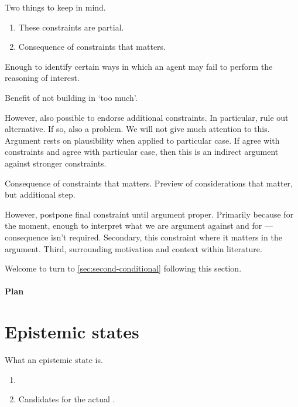 \begin{note}
  Two things to keep in mind.

  \begin{enumerate}
  \item These constraints are partial.
  \item Consequence of constraints that matters.
  \end{enumerate}

  Enough to identify certain ways in which an agent may fail to perform the reasoning of interest.

  Benefit of not building in `too much'.

  However, also possible to endorse additional constraints.
  In particular, rule out alternative.
  If so, also a problem.
  We will not give much attention to this.
  Argument rests on plausibility when applied to particular case.
  If agree with constraints and agree with particular case, then this is an indirect argument against stronger constraints.


  Consequence of constraints that matters.
  Preview of considerations that matter, but additional step.

  However, postpone final constraint until argument proper.
  Primarily because for the moment, enough to interpret what we are argument against and for --- consequence isn't required.
  Secondary, this constraint where it matters in the argument.
  Third, surrounding motivation and context within literature.

  Welcome to turn to \autoref{sec:second-conditional} following this section.
\end{note}

\paragraph{Plan}


\section{Epistemic states}
\label{sec:epistemic-states}

\begin{note}
  What an epistemic state is.
\end{note}

\begin{note}
  \begin{definition}
    \begin{enumerate}
    \item {} 
    \item Candidates for the actual \world{}.
    \end{enumerate}
  \end{definition}
\end{note}

